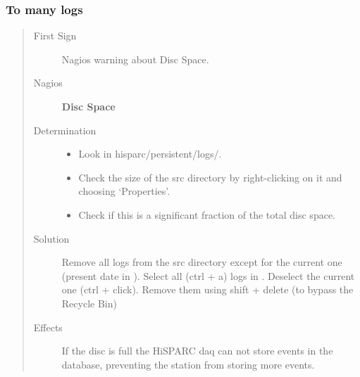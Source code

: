 \documentclass[a4paper,11pt,english]{sphinxmanual}
\begin{document}
\subsubsection{To many logs}
\label{known-issues:to-many-logs}\begin{quote}\begin{description}
\item[{First Sign}] \leavevmode
Nagios warning about Disc Space.

\item[{Nagios}] \leavevmode
\textbf{Disc Space}

\item[{Determination}] \leavevmode\begin{itemize}
\item {} 
Look in hisparc/persistent/logs/.

\item {} 
Check the size of the src directory by right-clicking on it and choosing `Properties'.

\item {} 
Check if this is a significant fraction of the total disc space.

\end{itemize}

\item[{Solution}] \leavevmode
Remove all logs from the src directory except for the current one (present date in ). Select all (ctrl + a) logs in . Deselect the current one (ctrl + click). Remove them using shift + delete (to bypass the Recycle Bin)

\item[{Effects}] \leavevmode
If the disc is full the HiSPARC daq can not store events in the database, preventing the station from storing more events.

\end{description}\end{quote}
\end{document}

